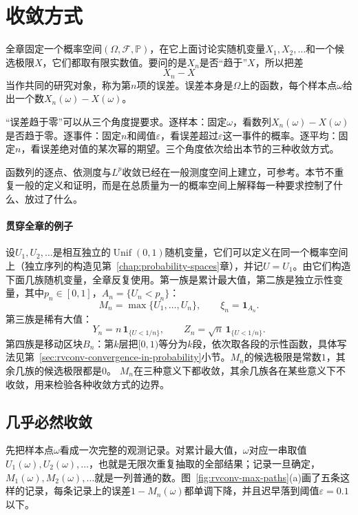 \section{收敛方式}
\label{sec:rvconv-modes}

全章固定一个概率空间$(\Omega,\mathcal{F},\mathbb{P})$，在它上面讨论实随机变量$X_1,X_2,\dots$和一个候选极限$X$，它们都取有限实数值。要问的是$X_n$是否“趋于”$X$，所以把差
\[
 X_n-X
\]
当作共同的研究对象，称为第$n$项的误差。误差本身是$\Omega$上的函数，每个样本点$\omega$给出一个数$X_n(\omega)-X(\omega)$。

“误差趋于零”可以从三个角度提要求。逐样本：固定$\omega$，看数列$X_n(\omega)-X(\omega)$是否趋于零。逐事件：固定$n$和阈值$\varepsilon$，看误差超过$\varepsilon$这一事件的概率。逐平均：固定$n$，看误差绝对值的某次幂的期望。三个角度依次给出本节的三种收敛方式。

函数列的逐点、依测度与$L^{p}$收敛已经在一般测度空间上建立，可参考。本节不重复一般的定义和证明，而是在总质量为一的概率空间上解释每一种要求控制了什么、放过了什么。

\paragraph{贯穿全章的例子}
设$U_1,U_2,\dots$是相互独立的$\operatorname{Unif}(0,1)$随机变量，它们可以定义在同一个概率空间上（独立序列的构造见第~\ref{chap:probability-spaces}章），并记$U=U_1$。由它们构造下面几族随机变量，全章反复使用。第一族是累计最大值，第二族是独立示性变量，其中$p_n\in[0,1]$，$A_n=\{U_n<p_n\}$：
\[
 M_n=\max\{U_1,\dots,U_n\},\qquad \xi_n=\mathbf{1}_{A_n} .
\]
第三族是稀有大值：
\[
 Y_n=n\,\mathbf{1}_{\{U<1/n\}},\qquad Z_n=\sqrt{n}\,\mathbf{1}_{\{U<1/n\}} .
\]
第四族是移动区块$B_n$：第$k$层把$[0,1)$等分为$k$段，依次取各段的示性函数，具体写法见第~\ref{sec:rvconv-convergence-in-probability}小节。$M_n$的候选极限是常数$1$，其余几族的候选极限都是$0$。
$M_n$在三种意义下都收敛，其余几族各在某些意义下不收敛，用来检验各种收敛方式的边界。

\subsection{几乎必然收敛}
\label{sec:rvconv-almost-sure}

先把样本点$\omega$看成一次完整的观测记录。对累计最大值，$\omega$对应一串取值$U_1(\omega),U_2(\omega),\dots$，也就是无限次重复抽取的全部结果；记录一旦确定，$M_1(\omega),M_2(\omega),\dots$就是一列普通的数。图~\ref{fig:rvconv-max-paths}(a)画了五条这样的记录，每条记录上的误差$1-M_n(\omega)$都单调下降，并且迟早落到阈值$\varepsilon=0.1$以下。

